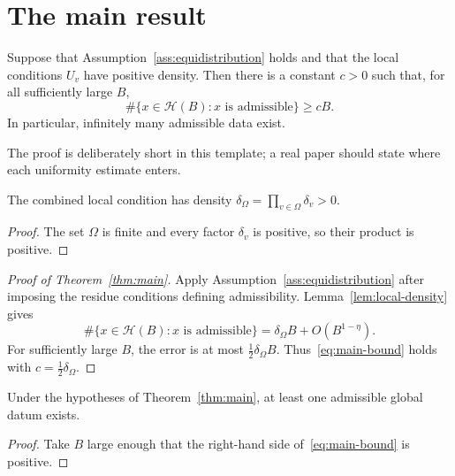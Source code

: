 \section{The main result}\label{sec:main-result}

\begin{theorem}\label{thm:main}
Suppose that Assumption~\ref{ass:equidistribution} holds and that the local
conditions $U_v$ have positive density. Then there is a constant $c>0$ such
that, for all sufficiently large $B$,
\begin{equation}\label{eq:main-bound}
  \#\{x\in\mathcal{H}(B):x\text{ is admissible}\}\geq cB.
\end{equation}
In particular, infinitely many admissible data exist.
\end{theorem}

The proof is deliberately short in this template; a real paper should state
where each uniformity estimate enters.

\begin{lemma}\label{lem:local-density}
The combined local condition has density
$\delta_{\Omega}=\prod_{v\in\Omega}\delta_v>0$.
\end{lemma}

\begin{proof}
The set $\Omega$ is finite and every factor $\delta_v$ is positive, so their
product is positive.
\end{proof}

\begin{proof}[Proof of Theorem~\ref{thm:main}]
Apply Assumption~\ref{ass:equidistribution} after imposing the residue
conditions defining admissibility. Lemma~\ref{lem:local-density} gives
\begin{equation*}
  \#\{x\in\mathcal{H}(B):x\text{ is admissible}\}
  =\delta_{\Omega}B+O\!\left(B^{1-\eta}\right).
\end{equation*}
For sufficiently large $B$, the error is at most
$\tfrac12\delta_{\Omega}B$. Thus~\eqref{eq:main-bound} holds with
$c=\tfrac12\delta_{\Omega}$.
\end{proof}

\begin{corollary}\label{cor:existence}
Under the hypotheses of Theorem~\ref{thm:main}, at least one admissible global
datum exists.
\end{corollary}

\begin{proof}
Take $B$ large enough that the right-hand side
of~\eqref{eq:main-bound} is positive.
\end{proof}
